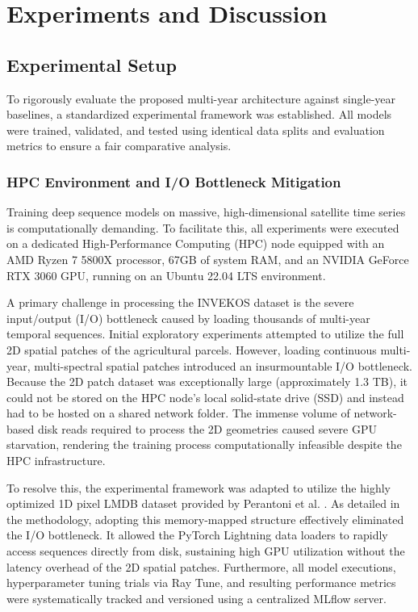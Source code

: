 \chapter{Experiments and Discussion}
\label{cha:experiments_discussion}


\section{Experimental Setup}
\label{sec:experimental_setup}

To rigorously evaluate the proposed multi-year architecture against single-year baselines, a standardized experimental framework was established.
All models were trained, validated, and tested using identical data splits and evaluation metrics to ensure a fair comparative analysis.

\subsection{HPC Environment and I/O Bottleneck Mitigation}
\label{subsec:hpc_environment}

Training deep sequence models on massive, high-dimensional satellite time series is computationally demanding.
To facilitate this, all experiments were executed on a dedicated High-Performance Computing (HPC) node equipped with an AMD Ryzen 7 5800X processor,
67GB of system RAM, and an NVIDIA GeForce RTX 3060 GPU, running on an Ubuntu 22.04 LTS environment.

A primary challenge in processing the INVEKOS dataset is the severe input/output (I/O) bottleneck caused by loading thousands of multi-year temporal sequences.
Initial exploratory experiments attempted to utilize the full 2D spatial patches of the agricultural parcels.
However, loading continuous multi-year, multi-spectral spatial patches introduced an insurmountable I/O bottleneck.
Because the 2D patch dataset was exceptionally large (approximately 1.3 TB), it could not be stored on the
HPC node's local solid-state drive (SSD) and instead had to be hosted on a shared network folder.
The immense volume of network-based disk reads required to process the 2D geometries caused severe GPU starvation,
rendering the training process computationally infeasible despite the HPC infrastructure.

To resolve this, the experimental framework was adapted to utilize the highly optimized 1D pixel LMDB dataset provided by Perantoni et al. \cite{perantoni_bayesian_2024}.
As detailed in the methodology, adopting this memory-mapped structure effectively eliminated the I/O bottleneck.
It allowed the PyTorch Lightning data loaders to rapidly access sequences directly from disk, sustaining high GPU utilization without the latency overhead of the 2D spatial patches.
Furthermore, all model executions, hyperparameter tuning trials via Ray Tune, and resulting performance metrics were systematically tracked and versioned using a centralized MLflow server.

